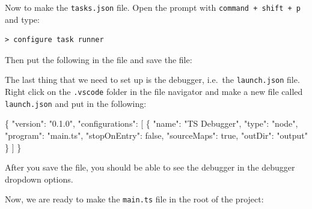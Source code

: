 \documentclass[12pt,]{article}
\newenvironment{Shaded}{}{}
\newcommand{\KeywordTok}[1]{\textcolor[rgb]{0.00,0.00,1.00}{{#1}}}
\newcommand{\StringTok}[1]{\textcolor[rgb]{0.00,0.50,0.50}{{#1}}}
\newcommand{\OperatorTok}[1]{{#1}}
\newcommand{\NormalTok}[1]{{#1}}
\begin{document}
Now to make the \texttt{tasks.json} file. Open the prompt with
\texttt{command\ +\ shift\ +\ p} and type:

\begin{verbatim}
> configure task runner
\end{verbatim}

Then put the following in the file and save the file:

\begin{Shaded}
\end{Shaded}

The last thing that we need to set up is the debugger, i.e.~the
\texttt{launch.json} file. Right click on the \texttt{.vscode} folder in
the file navigator and make a new file called \texttt{launch.json} and
put in the following:

\begin{Shaded}
\begin{Highlighting}[numbers=left,,]
\OperatorTok{\{}
  \StringTok{"version"}\OperatorTok{:} \StringTok{"0.1.0"}\OperatorTok{,}
  \StringTok{"configurations"}\OperatorTok{:} \NormalTok{[}
    \OperatorTok{\{}
      \StringTok{"name"}\OperatorTok{:} \StringTok{"TS Debugger"}\OperatorTok{,}
      \StringTok{"type"}\OperatorTok{:} \StringTok{"node"}\OperatorTok{,}
      \StringTok{"program"}\OperatorTok{:} \StringTok{"main.ts"}\OperatorTok{,}
      \StringTok{"stopOnEntry"}\OperatorTok{:} \KeywordTok{false}\OperatorTok{,}
      \StringTok{"sourceMaps"}\OperatorTok{:} \KeywordTok{true}\OperatorTok{,}
      \StringTok{"outDir"}\OperatorTok{:} \StringTok{"output"}
    \OperatorTok{\}}
  \NormalTok{]}
\OperatorTok{\}}
\end{Highlighting}
\end{Shaded}

After you save the file, you should be able to see the debugger in the
debugger dropdown options.

Now, we are ready to make the \texttt{main.ts} file in the root of the
project:
\end{document}
